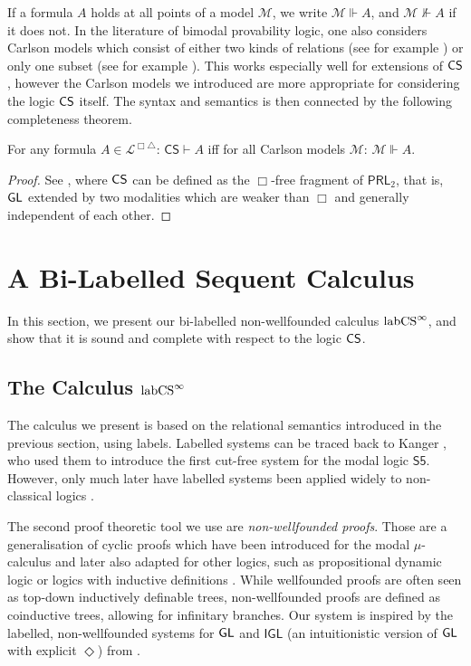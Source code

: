 \documentclass[runningheads,orivec]{llncs}
\newcommand{\CS}{\textnormal{\textsf{CS}}}
\newcommand{\GL}{\textnormal{\textsf{GL}}}
\newcommand{\labCS}{{\textnormal{labCS}^\infty}}
\newcommand{\Dmnd}{\Diamond}
\newcommand{\Mw}{\mathcal{M}}
\newcommand{\La}{\mathcal{L}}
\begin{document}
If a formula $A$ holds at all points of a model $\Mw$, we write $\Mw \Vdash A$, and $\Mw \nVdash A$ if it does not. 
In the literature of bimodal provability logic, one also considers Carlson models which consist of either two kinds of relations (see for example \cite{Visser95}) or only one subset (see for example \cite{Beklemishev94}). This works especially well for extensions of $\CS$, however the Carlson models we introduced are more appropriate for considering the logic $\CS$ itself.
The syntax and semantics is then connected by the following completeness theorem.

\begin{theorem}\label{thm:soundComplCS}
    For any formula $A \in \La^{\Box \triangle}$: $\mathsf{CS} \vdash A$ iff for all Carlson models $\Mw$: $\Mw \Vdash A$.
\end{theorem} 
\begin{proof}
    See \cite[Chapter 4, Theorem 3.5]{Smorynski85}, where $\CS$ can be defined as the $\Box$-free fragment of $\mathsf{PRL}_2$, that is, $\GL$ extended by two modalities which are weaker than $\Box$ and generally independent of each other.
\end{proof}


\section{A Bi-Labelled Sequent Calculus} \label{sec:labCS}

In this section, we present our bi-labelled non-wellfounded calculus $\labCS$, and show that it is sound and complete with respect to the logic $\CS$.

\subsection{The Calculus $\labCS$}

The calculus we present is based on the relational semantics introduced in the previous section, using labels. Labelled systems can be traced back to Kanger \cite{Kanger57}, who used them to introduce the first cut-free system for the modal logic $\mathsf{S5}$. However, only much later have labelled systems been applied widely to non-classical logics \cite{Gabbay_1996,Negri05,Simpson1994,Vigano2000}. 

The second proof theoretic tool we use are \emph{non-wellfounded proofs}. Those are a generalisation of cyclic proofs which have been introduced for the modal $\mu$-calculus \cite{Niwiński96} and later also adapted for other logics, such as propositional dynamic logic \cite{DochertyRowe_2019} or logics with inductive definitions \cite{Brotherston05,Simpson_2017}. 
While wellfounded proofs are often seen as top-down inductively definable trees, non-wellfounded proofs are defined as coinductive trees, allowing for infinitary branches. 
Our system is inspired by the labelled, non-wellfounded systems for $\GL$ and $\mathsf{IGL}$ (an intuitionistic version of $\GL$ with explicit $\Dmnd$) from \cite{Das_et_al24}.
\end{document}
